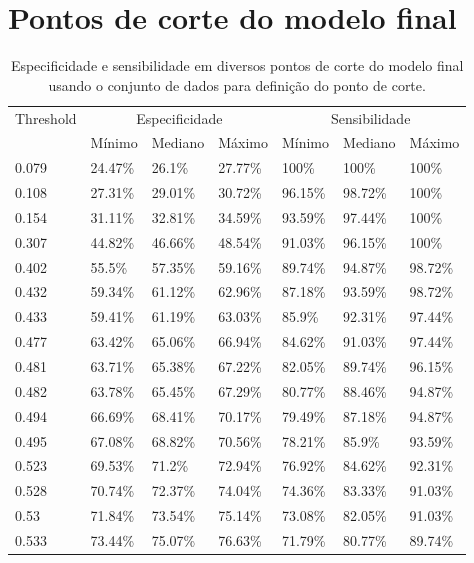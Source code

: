 \documentclass[a4paper,titlepage]{ppgi}\usepackage[]{graphicx}\usepackage[]{color}
\begin{document}
\chapter{Pontos de corte do modelo final}
\label{apendice:lista-pontos-de-corte}



\begin{longtable}{l l l l l l l}
\caption{Especificidade e sensibilidade em diversos pontos de corte do modelo
final usando o conjunto de dados para definição do ponto de corte.} \\
\centering
  Threshold & \multicolumn{3}{c}{Especificidade} & \multicolumn{3}{c}{Sensibilidade} \\ \cline{2-7}
            & \multicolumn{1}{|l}{Mínimo} & Mediano & Máximo & \multicolumn{1}{|l}{Mínimo} & Mediano & \multicolumn{1}{l|}{Máximo} \\
  \hline
  0.079 & 24.47\% & 26.1\% & 27.77\% & 100\% & 100\% & 100\% \\
0.108 & 27.31\% & 29.01\% & 30.72\% & 96.15\% & 98.72\% & 100\% \\
0.154 & 31.11\% & 32.81\% & 34.59\% & 93.59\% & 97.44\% & 100\% \\
0.307 & 44.82\% & 46.66\% & 48.54\% & 91.03\% & 96.15\% & 100\% \\
0.402 & 55.5\% & 57.35\% & 59.16\% & 89.74\% & 94.87\% & 98.72\% \\
0.432 & 59.34\% & 61.12\% & 62.96\% & 87.18\% & 93.59\% & 98.72\% \\
0.433 & 59.41\% & 61.19\% & 63.03\% & 85.9\% & 92.31\% & 97.44\% \\
0.477 & 63.42\% & 65.06\% & 66.94\% & 84.62\% & 91.03\% & 97.44\% \\
0.481 & 63.71\% & 65.38\% & 67.22\% & 82.05\% & 89.74\% & 96.15\% \\
0.482 & 63.78\% & 65.45\% & 67.29\% & 80.77\% & 88.46\% & 94.87\% \\
0.494 & 66.69\% & 68.41\% & 70.17\% & 79.49\% & 87.18\% & 94.87\% \\
0.495 & 67.08\% & 68.82\% & 70.56\% & 78.21\% & 85.9\% & 93.59\% \\
0.523 & 69.53\% & 71.2\% & 72.94\% & 76.92\% & 84.62\% & 92.31\% \\
0.528 & 70.74\% & 72.37\% & 74.04\% & 74.36\% & 83.33\% & 91.03\% \\
0.53 & 71.84\% & 73.54\% & 75.14\% & 73.08\% & 82.05\% & 91.03\% \\
0.533 & 73.44\% & 75.07\% & 76.63\% & 71.79\% & 80.77\% & 89.74\% \\

\end{longtable}
\end{document}
